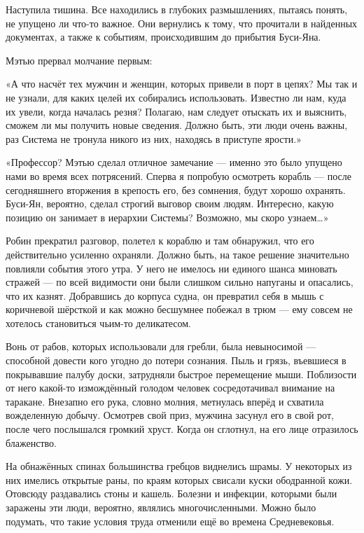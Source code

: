 \documentclass[a5paper, 9pt,
final, openany, twoside=true]{memoir}
\begin{document}
Наступила тишина. Все находились в глубоких размышлениях, пытаясь понять, не упущено ли что-то важное. Они вернулись к тому, что прочитали в найденных документах, а также к событиям, происходившим до прибытия Буси-Яна.

Мэтью прервал молчание первым:

«А что насчёт тех мужчин и женщин, которых привели в порт в цепях? Мы так и не узнали, для каких целей их собирались использовать. Известно ли нам, куда их увели, когда началась резня? Полагаю, нам следует отыскать их и выяснить, сможем ли мы получить новые сведения. Должно быть, эти люди очень важны, раз Система не тронула никого из них, находясь в приступе ярости.»

«Профессор? Мэтью сделал отличное замечание — именно это было упущено нами во время всех потрясений. Сперва я попробую осмотреть корабль — после сегодняшнего вторжения в крепость его, без сомнения, будут хорошо охранять. Буси-Ян, вероятно, сделал строгий выговор своим людям. Интересно, какую позицию он занимает в иерархии Системы? Возможно, мы скоро узнаем…»

Робин прекратил разговор, полетел к кораблю и там обнаружил, что его действительно усиленно охраняли. Должно быть, на такое решение значительно повлияли события этого утра. У него не имелось ни единого шанса миновать стражей — по всей видимости они были слишком сильно напуганы и опасались, что их казнят. Добравшись до корпуса судна, он превратил себя в мышь с коричневой шёрсткой и как можно бесшумнее побежал в трюм — ему совсем не хотелось становиться чьим-то деликатесом.

Вонь от рабов, которых использовали для гребли, была невыносимой — способной довести кого угодно до потери сознания. Пыль и грязь, въевшиеся в покрывавшие палубу доски, затрудняли быстрое перемещение мыши. Поблизости от него какой-то измождённый голодом человек сосредотачивал внимание на таракане. Внезапно его рука, словно молния, метнулась вперёд и схватила вожделенную добычу. Осмотрев свой приз, мужчина засунул его в свой рот, после чего послышался громкий хруст. Когда он сглотнул, на его лице отразилось блаженство.

На обнажённых спинах большинства гребцов виднелись шрамы. У некоторых из них имелись открытые раны, по краям которых свисали куски ободранной кожи. Отовсюду раздавались стоны и кашель. Болезни и инфекции, которыми были заражены эти люди, вероятно, являлись многочисленными. Можно было подумать, что такие условия труда отменили ещё во времена Средневековья.
\end{document}
